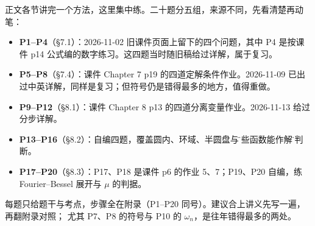 ﻿%
\clearpage
{}\label{sec:practice}

正文各节讲完一个方法，这里集中练。二十题分五组，来源不同，先看清楚再动笔：

\begin{itemize}
  \item \textbf{P1--P4}（§7.1）：2026-11-02 旧课件页面上留下的四个问题，其中 P4 是按课件 p14 公式编的数字练习。这四题当时随旧稿给过详解，属于复习。
  \item \textbf{P5--P8}（§7.4）：课件 Chapter 7 p19 的四道定解条件作业。2026-11-09 已出过中英详解，同样是复习；但符号仍是错得最多的地方，值得重做。
  \item \textbf{P9--P12}（§8.1）：课件 Chapter 8 p13 的四道分离变量作业。2026-11-13 给过分步详解。
  \item \textbf{P13--P16}（§8.2）：自编四题，覆盖圆内、环域、半圆盘与\"哪些函数能作解\"的判断。
  \item \textbf{P17--P20}（§8.3）：P17、P18 是课件 p6 的作业 5、7；P19、P20 自编，练 Fourier--Bessel 展开与 $\mu$ 的判据。
\end{itemize}

每题只给题干与考点，步骤全在附录（P1--P20 同号）。建议合上讲义先写一遍，再翻附录对照；
尤其 P7、P8 的符号与 P10 的 $\omega_n$，是往年错得最多的两处。






